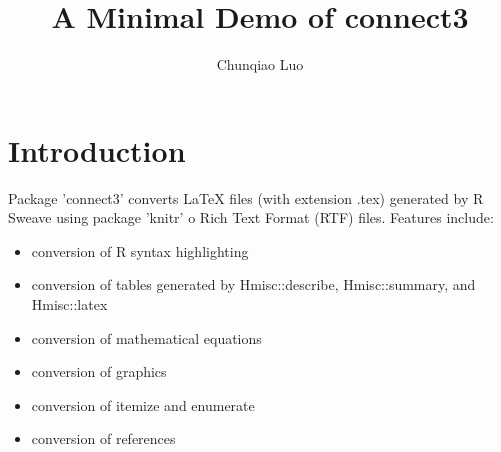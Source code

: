 \documentclass[11pt, a4paper]{article}\usepackage[]{graphicx}\usepackage[]{color}
\begin{document}
\title{A Minimal Demo of connect3}
\author{Chunqiao Luo}
\maketitle

\section{Introduction}
Package 'connect3' converts LaTeX files (with extension .tex) generated by R Sweave using package 'knitr' o Rich Text Format (RTF) files. Features include: 
\begin{itemize}
\item conversion of R syntax highlighting
\item conversion of tables generated by Hmisc::describe, Hmisc::summary, and Hmisc::latex
\item conversion of mathematical equations
\item conversion of graphics
\item conversion of itemize and enumerate
\item conversion of references
\end{itemize}
\end{document}
